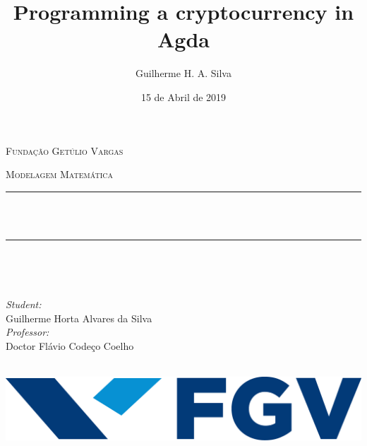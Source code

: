 \documentclass[12pt]{article}
\title{Programming a cryptocurrency in Agda}
\author{Guilherme H. A. Silva}
\date{15 de Abril de 2019}
\makeatletter
\let\thetitle\@title
\makeatother
\begin{document}

\begin{titlepage}
	\centering
    \vspace*{0.5 cm}
   \begin{center}    \textsc{\Large   Fundação Getúlio Vargas}\\[2.0 cm]	\end{center}%
   \textsc{\Large Modelagem Matemática  }\\[0.5 cm]				%
	\rule{\linewidth}{0.2 mm} \\[0.4 cm]
	{ \huge \bfseries \thetitle}\\
	\rule{\linewidth}{0.2 mm} \\[1.5 cm]
	
	\begin{minipage}{0.4\textwidth}
		\begin{flushleft} \large
			\end{flushleft}
			\end{minipage}~
			\begin{minipage}{0.4\textwidth}
            
			\begin{flushright} \large
        \emph{Student:} \\
        Guilherme Horta Alvares da Silva \\
        \emph{Professor:} \\
        Doctor Flávio Codeço Coelho
		\end{flushright}
           
	\end{minipage}\\[2 cm]

  \includegraphics[scale = 0.5]{imgs/FGV.png}
    
	
\end{titlepage}
\end{document}
